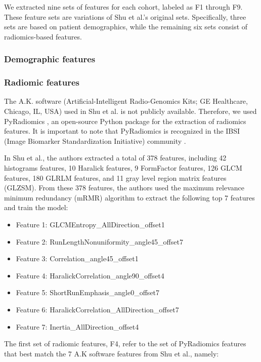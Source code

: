 We extracted nine sets of features for each cohort, labeled as F1 through F9. These feature sets are variations of Shu et al.'s original sets. Specifically, three sets are based on patient demographics, while the remaining six sets consist of radiomics-based features.

\subsubsection*{Demographic features}

\subsubsection*{Radiomic features}
The A.K. software (Artificial-Intelligent Radio-Genomics Kits; GE Healthcare, Chicago, IL, USA) used in Shu et al. is not publicly available. Therefore, we used PyRadiomics \cite{pyradiomics_2017}, an open-source Python package for the extraction of radiomics features. It is important to note that PyRadiomics is recognized in the IBSI (Image Biomarker Standardization Initiative) community \cite{Zwanenburg_2020}.

In Shu et al., the authors extracted a total of 378 features, including 42 histograms features, 10 Haralick features, 9 FormFactor features, 126 GLCM features, 180 GLRLM features, and 11 gray level region matrix features (GLZSM). From these 378 features, the authors used the maximum relevance minimum redundancy (mRMR) algorithm to extract the following top 7 features and train the model:
\begin{itemize}
    \item Feature 1: GLCMEntropy\_AllDirection\_offset1
    \item Feature 2: RunLengthNonuniformity\_angle45\_offset7
    \item Feature 3: Correlation\_angle45\_offset1
    \item Feature 4: HaralickCorrelation\_angle90\_offset4
    \item Feature 5: ShortRunEmphasis\_angle0\_offset7
    \item Feature 6: HaralickCorrelation\_AllDirection\_offset7
    \item Feature 7: Inertia\_AllDirection\_offset4
\end{itemize}

The first set of radiomic features, F4, refer to the set of PyRadiomics features that best match the 7 A.K software features from Shu et al., namely:

